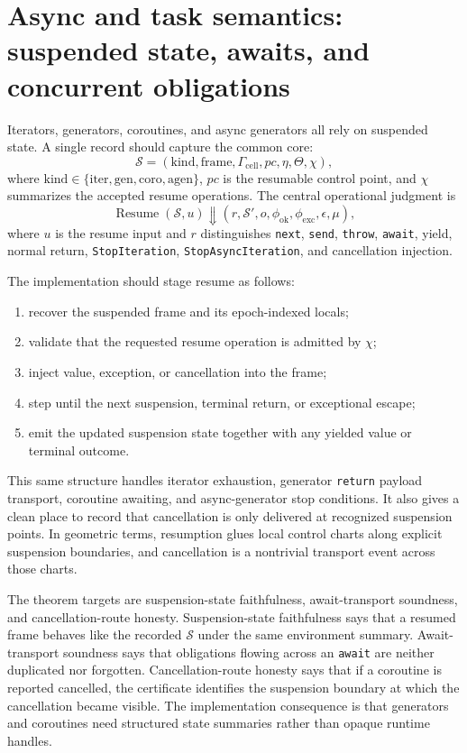 \documentclass[11pt]{report}
\begin{document}
\section{Async and task semantics: suspended state, awaits, and concurrent obligations}
Iterators, generators, coroutines, and async generators all rely on suspended state. A single record should capture the common core:
\[
\mathcal{S} = (\mathrm{kind},\mathrm{frame},\Gamma_{\mathrm{cell}},pc,\eta,\Theta,\chi),
\]
where $\mathrm{kind}\in\{\mathrm{iter},\mathrm{gen},\mathrm{coro},\mathrm{agen}\}$, $pc$ is the resumable control point, and $\chi$ summarizes the accepted resume operations. The central operational judgment is
\[
\operatorname{Resume}(\mathcal{S},u) \Downarrow (r,\mathcal{S}',o,\phi_{\mathrm{ok}},\phi_{\mathrm{exc}},\epsilon,\mu),
\]
where $u$ is the resume input and $r$ distinguishes \texttt{next}, \texttt{send}, \texttt{throw}, \texttt{await}, yield, normal return, \texttt{StopIteration}, \texttt{StopAsyncIteration}, and cancellation injection.

The implementation should stage resume as follows:
\begin{enumerate}
\item recover the suspended frame and its epoch-indexed locals;
\item validate that the requested resume operation is admitted by $\chi$;
\item inject value, exception, or cancellation into the frame;
\item step until the next suspension, terminal return, or exceptional escape;
\item emit the updated suspension state together with any yielded value or terminal outcome.
\end{enumerate}
This same structure handles iterator exhaustion, generator \texttt{return} payload transport, coroutine awaiting, and async-generator stop conditions. It also gives a clean place to record that cancellation is only delivered at recognized suspension points. In geometric terms, resumption glues local control charts along explicit suspension boundaries, and cancellation is a nontrivial transport event across those charts.

The theorem targets are suspension-state faithfulness, await-transport soundness, and cancellation-route honesty. Suspension-state faithfulness says that a resumed frame behaves like the recorded $\mathcal{S}$ under the same environment summary. Await-transport soundness says that obligations flowing across an \texttt{await} are neither duplicated nor forgotten. Cancellation-route honesty says that if a coroutine is reported cancelled, the certificate identifies the suspension boundary at which the cancellation became visible. The implementation consequence is that generators and coroutines need structured state summaries rather than opaque runtime handles.
\end{document}
